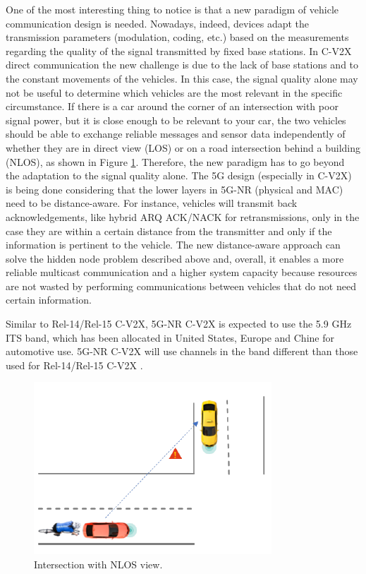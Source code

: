 \documentclass[conference,12pt,onecolumn]{IEEEtran}
\begin{document}
One of the most interesting thing to notice is that a new paradigm of vehicle communication design is needed. Nowadays, indeed, devices adapt the transmission parameters (modulation, coding, etc.) based on the measurements regarding the quality of the signal transmitted by fixed base stations. In C-V2X direct communication the new challenge is due to the lack of base stations and to the constant movements of the vehicles. In this case, the signal quality alone may not be useful to determine which vehicles are the most relevant in the specific circumstance. If there is a car around the corner of an intersection with poor signal power, but it is close enough to be relevant to your car, the two vehicles should be able to exchange reliable messages and sensor data independently of whether they are in direct view (LOS) or on a road intersection behind a building (NLOS), as shown in Figure \ref{fig:intersection}. Therefore, the new paradigm has to go beyond the adaptation to the signal quality alone. The 5G design (especially in C-V2X) is being done considering that the lower layers in 5G-NR (physical and MAC) need to be distance-aware. For instance, vehicles will transmit back acknowledgements, like hybrid ARQ ACK/NACK for retransmissions, only in the case they are within a certain distance from the transmitter and only if the information is pertinent to the vehicle. The new distance-aware approach can solve the hidden node problem described above and, overall, it enables a more reliable multicast communication and a higher system capacity because resources are not wasted by performing communications between vehicles that do not need certain information.

Similar to Rel-14/Rel-15 C-V2X, 5G-NR C-V2X is expected to use the 5.9 GHz ITS band, which has been allocated in United States, Europe and Chine for automotive use. 5G-NR C-V2X will use channels in the band different than those used for Rel-14/Rel-15 C-V2X \cite{5GAAwhite}.

\begin{figure} [ht]
   \centering
  \includegraphics[width=0.5\linewidth]{_Graphics/intersection.png}
  \caption{Intersection with NLOS view. \cite{5gamericas2018}}
  \label{fig:intersection}
\end{figure}
\end{document}
